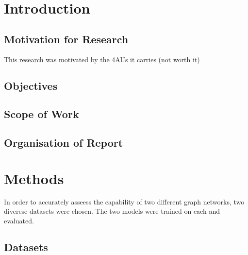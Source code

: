 \documentclass[12pt]{article}
\begin{document}
\pagebreak
\renewcommand{\cftdotsep}{0.5}
\renewcommand{\cftsecleader}{\cftdotfill{\cftdotsep}}
\renewcommand{\contentsname}{Table of Contents}  %
\setlength{\cftbeforesecskip}{10pt}   %
\setlength{\cftbeforesubsecskip}{10pt} %
\setlength{\cftbeforesubsubsecskip}{10pt} %
\renewcommand{\cftsecpresnum}{Chapter~} %
\renewcommand{\cftsecaftersnum}{\quad} 
\setlength{\cftsecnumwidth}{6.1em}   %
\tableofcontents

\pagebreak
{}
\section{Introduction}

\subsection{Motivation for Research}

This research was motivated by the 4AUs it carries (not worth it)

\subsection{Objectives}

\subsection{Scope of Work}

\subsection{Organisation of Report}

\pagebreak
\section{Methods}
In order to accurately asseess the capability of two different graph networks, two diverese datasets were chosen. The two models were trained on each and evaluated.

\subsection{Datasets} 
\end{document}
